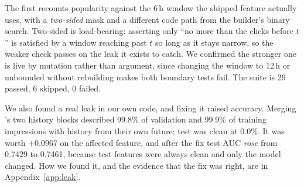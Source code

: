 The first recounts popularity against the 6\,h window the shipped feature actually uses, with a \emph{two-sided} mask and a different code path from the builder's binary search. Two-sided
is load-bearing: asserting only ``no more than the clicks before $t$'' is satisfied by a window
reaching past $t$ so long as it stays narrow, so the weaker check passes on the leak it exists to
catch. We confirmed the stronger one is live by mutation rather than argument, since changing the
window to 12\,h or unbounded without rebuilding makes both boundary tests fail. The suite is 29 passed, 6 skipped, 0 failed.

We also found a real leak in our own code, and fixing it raised accuracy. Merging \eb{}'s two
history blocks described 99.8\% of validation and 99.9\% of training impressions with history from
their own future; test was clean at 0.0\%. It was worth $+$0.0967 on the affected
feature, and after the fix test AUC \emph{rose} from 0.7429 to 0.7461, because test features were
always clean and only the model changed. How we found it, and the evidence that the fix was right,
are in Appendix~\ref{app:leak}.
